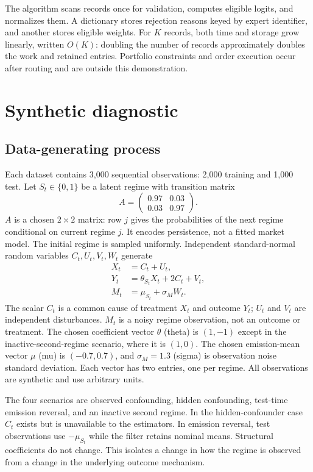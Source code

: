 The algorithm scans records once for validation, computes eligible logits, and normalizes them. A dictionary stores rejection reasons keyed by expert identifier, and another stores eligible weights. For $K$ records, both time and storage grow linearly, written $O(K)$: doubling the number of records approximately doubles the work and retained entries. Portfolio constraints and order execution occur after routing and are outside this demonstration.

\section{Synthetic diagnostic}
\subsection{Data-generating process}
Each dataset contains 3,000 sequential observations: 2,000 training and 1,000 test. Let $S_t\in\{0,1\}$ be a latent regime with transition matrix
\begin{equation}
 A=\begin{pmatrix}0.97&0.03\\0.03&0.97\end{pmatrix}.
\end{equation}
$A$ is a chosen $2\times2$ matrix: row $j$ gives the probabilities of the next regime conditional on current regime $j$. It encodes persistence, not a fitted market model. The initial regime is sampled uniformly. Independent standard-normal random variables $C_t,U_t,V_t,W_t$ generate
\begin{align}
 X_t&=C_t+U_t,\\
 Y_t&=\theta_{S_t}X_t+2C_t+V_t,\\
 M_t&=\mu_{S_t}+\sigma_M W_t.
\end{align}
The scalar $C_t$ is a common cause of treatment $X_t$ and outcome $Y_t$; $U_t$ and $V_t$ are independent disturbances. $M_t$ is a noisy regime observation, not an outcome or treatment. The chosen coefficient vector $\theta$ (theta) is $(1,-1)$ except in the inactive-second-regime scenario, where it is $(1,0)$. The chosen emission-mean vector $\mu$ (mu) is $(-0.7,0.7)$, and $\sigma_M=1.3$ (sigma) is observation noise standard deviation. Each vector has two entries, one per regime. All observations are synthetic and use arbitrary units.

The four scenarios are observed confounding, hidden confounding, test-time emission reversal, and an inactive second regime. In the hidden-confounder case $C_t$ exists but is unavailable to the estimators. In emission reversal, test observations use $-\mu_{S_t}$ while the filter retains nominal means. Structural coefficients do not change. This isolates a change in how the regime is observed from a change in the underlying outcome mechanism.

